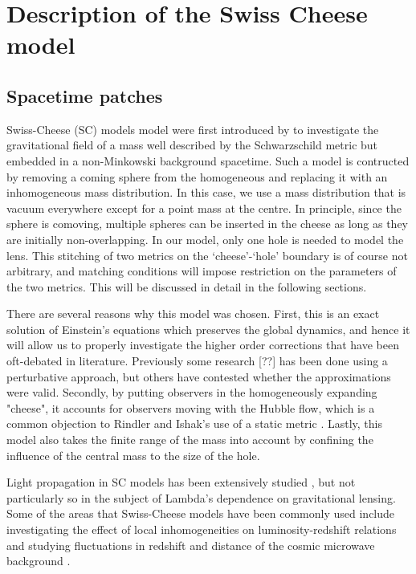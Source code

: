 \chapter{Description of the Swiss Cheese model}
\label{chapter:swiss-cheese}

\section{Spacetime patches}

Swiss-Cheese (SC) models model were first introduced by \citet{einstein1945influence} to investigate the gravitational field of a mass well described by the Schwarzschild metric but embedded in a non-Minkowski background spacetime. Such a model is contructed by removing a coming sphere from the homogeneous and replacing it with an inhomogeneous mass distribution. In this case, we use a mass distribution that is vacuum everywhere except for a point mass at the centre. In principle, since the sphere is comoving, multiple spheres can be inserted in the cheese as long as they are initially non-overlapping. In our model, only one hole is needed to model the lens. This stitching of two metrics on the `cheese'-`hole' boundary is of course not arbitrary, and matching conditions will impose restriction on the parameters of the two metrics. This will be discussed in detail in the following sections. 

There are several reasons why this model was chosen. First, this is an exact solution of Einstein's equations which preserves the global dynamics, and hence it will allow us to properly investigate the higher order corrections that have been oft-debated in literature. Previously some research \citep{simpson2010lensing}[??] has been done using a perturbative approach, but others \citep{ishak2010more} have contested whether the approximations were valid. Secondly, by putting observers in the homogeneously expanding "cheese", it accounts for observers moving with the Hubble flow, which is a common objection to Rindler and Ishak's use of a static metric \citep{simpson2010lensing,butcher2016no,park2008rigorous,khriplovich2008does}. Lastly, this model also takes the finite range of the mass into account by confining the influence of the central mass to the size of the hole. 

Light propagation in SC models has been extensively studied \citep{szybka2011light,vanderveld2008luminosity,fleury2014swiss}, but not particularly so in the subject of Lambda's dependence on gravitational lensing. Some of the areas that Swiss-Cheese models have been commonly used include investigating the effect of local inhomogeneities on luminosity-redshift relations \citep{kantowski1969corrections,fleury2013interpretation} and studying fluctuations in redshift and distance of the cosmic microwave background \citep{bolejko2009szekeres,valkenburg2009swiss,bolejko2011effect}.

